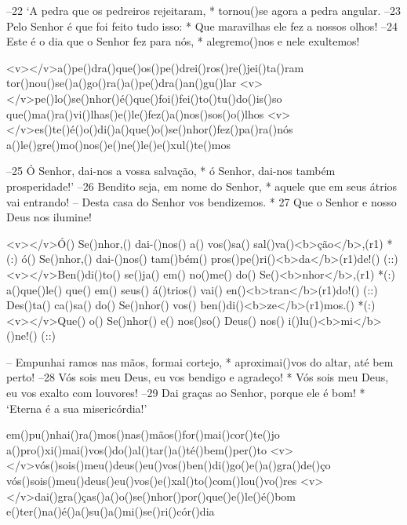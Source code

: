 –22 ‘A pedra que os pedreiros rejeitaram, *
tornou()se agora a pedra angular.
–23 Pelo Senhor é que foi feito tudo isso: *
Que maravilhas ele fez a nossos olhos!
–24 Este é o dia que o Senhor fez para nós, *
alegremo()nos e nele exultemos!

<v></v>a()pe()dra()que()os()pe()drei()ros()re()jei()ta()ram
tor()nou()se()a()go()ra()a()pe()dra()an()gu()lar
<v></v>pe()lo()se()nhor()é()que()foi()fei()to()tu()do()is()so
que()ma()ra()vi()lhas()e()le()fez()a()nos()sos()o()lhos
<v></v>es()te()é()o()di()a()que()o()se()nhor()fez()pa()ra()nós
a()le()gre()mo()nos()e()ne()le()e()xul()te()mos

–25 Ó Senhor, dai-nos a vossa salvação, *
ó Senhor, dai-nos também prosperidade!’
–26 Bendito seja, em nome do Senhor, *
aquele que em seus átrios vai entrando!
– Desta casa do Senhor vos bendizemos. *
27 Que o Senhor e nosso Deus nos ilumine!

<v></v>Ó() Se()nhor,() dai-()nos() a() vos()sa() sal()va()<b>ção</b>,(r1) *(:)
ó() Se()nhor,() dai-()nos() tam()bém() pros()pe()ri()<b>da</b>(r1)de!() (::)
<v></v>Ben()di()to() se()ja() em() no()me() do() Se()<b>nhor</b>,(r1) *(:)
a()que()le() que() em() seus() á()trios() vai() en()<b>tran</b>(r1)do!() (::)
Des()ta() ca()sa() do() Se()nhor() vos() ben()di()<b>ze</b>(r1)mos.() *(:)
<v></v>Que() o() Se()nhor() e() nos()so() Deus() nos() i()lu()<b>mi</b>()ne!() (::)

– Empunhai ramos nas mãos, formai cortejo, *
aproximai()vos do altar, até bem perto!
–28 Vós sois meu Deus, eu vos bendigo e agradeço! *
Vós sois meu Deus, eu vos exalto com louvores!
–29 Dai graças ao Senhor, porque ele é bom! *
‘Eterna é a sua misericórdia!’

em()pu()nhai()ra()mos()nas()mãos()for()mai()cor()te()jo
a()pro()xi()mai()vos()do()al()tar()a()té()bem()per()to
<v></v>vós()sois()meu()deus()eu()vos()ben()di()go()e()a()gra()de()ço
vós()sois()meu()deus()eu()vos()e()xal()to()com()lou()vo()res
<v></v>dai()gra()ças()a()o()se()nhor()por()que()e()le()é()bom
e()ter()na()é()a()su()a()mi()se()ri()cór()dia